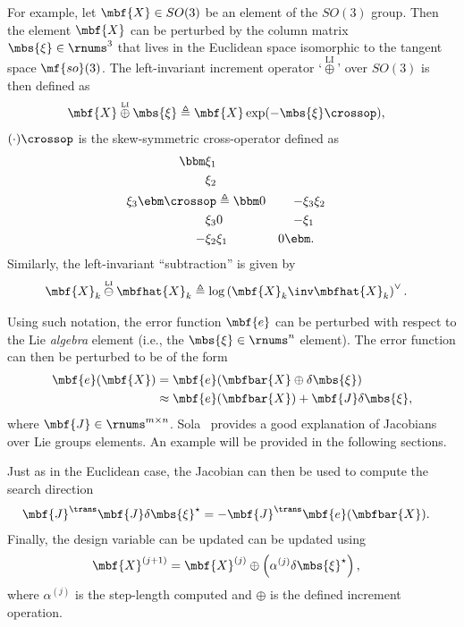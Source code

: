 \documentclass[ nobib, nofonts, notoc]{tufte-handout}
\newcommand{\liplus}{\overset{{\scriptscriptstyle\mathrm{LI}}}{\oplus}}
\newcommand{\liminus}{\overset{{\scriptscriptstyle\mathrm{LI}}}{\ominus}}
\begin{document}
    For example, let $\mbf{X}\in SO(3)$ be an element of the $SO(3)$ group.
    Then the element $\mbf{X}$ can be perturbed by the column matrix $\mbs{\xi}\in\rnums^{3}$ that lives in the Euclidean space isomorphic to the tangent space $\mf{so}(3)$.
    The left-invariant increment operator `$\liplus$' over $SO(3)$ is then defined as
    \begin{align}
        \mbf{X} \liplus \mbs{\xi} &\triangleq \mbf{X}\exp(-\mbs{\xi}\crossop),
    \end{align}
        $(\cdot)\crossop$ is the skew-symmetric cross-operator defined as \cite{Barfoot_State_2017}
    \begin{align}
        \bbm
            \xi_{1}\\
            \xi_{2}\\
            \xi_{3}
        \ebm\crossop
        &\triangleq
        \bbm
            0 & -\xi_{3} & \xi_{2} \\
            \xi_{3} & 0 & -\xi_{1}\\
            -\xi_{2} & \xi_{1} & 0
        \ebm.
    \end{align}
    Similarly, the left-invariant ``subtraction'' is given by
    \begin{align}
      \label{eq:liminus definition}
      \mbf{X}_{k} \liminus \mbfhat{X}_{k}
      &\triangleq
      \log\left( 
          \mbf{X}_{k}\inv
          \mbfhat{X}_{k}
       \right)^{\vee}.
    \end{align}

    Using such notation, the error function $\mbf{e}$ can be perturbed with respect to the Lie \emph{algebra} element (i.e., the $\mbs{\xi}\in\rnums^{n}$ element).
    The error function can then be perturbed to be of the form
    \begin{align}
        \mbf{e}(\mbf{X})
        &= \mbf{e}(\mbfbar{X}\oplus \delta\mbs{\xi})\\
        &\approx \mbf{e}(\mbfbar{X}) + \mbf{J}\delta\mbs{\xi},
    \end{align}
    where $\mbf{J}\in\rnums^{m\times n}$.
    Sola~\cite{Sola_Micro_2020} provides a good explanation of Jacobians over Lie groups elements.
    An example will be provided in the following sections.

    Just as in the Euclidean case, the Jacobian can then be used to compute the search direction
    \begin{align}
        \mbf{J}^{\trans}\mbf{J}\delta\mbs{\xi}^{\star} &= -\mbf{J}^{\trans}\mbf{e}(\mbfbar{X}).
    \end{align}
    Finally, the design variable can be updated can be updated using
    \begin{align}
        \mbf{X}^{(j+1)} &= \mbf{X}^{(j)}\oplus \left( \alpha^{(j)}\delta\mbs{\xi}^{\star} \right),
    \end{align}
    where $\alpha^{(j)}$ is the step-length computed and $\oplus$ is the defined increment operation.
\end{document}
